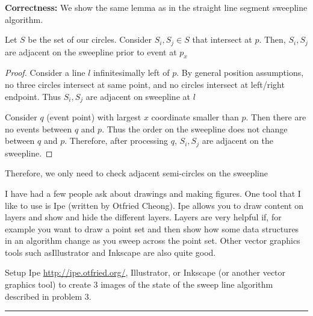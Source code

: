 \documentclass[11pt]{article}
\begin{document}
\textbf{Correctness: } We show the same lemma as in the straight line segment sweepline algorithm.

\begin{lemma}
    Let $S$ be the set of our circles. Consider $S_i, S_j \in S$ that intersect at $p$.
    Then, $S_i, S_j$ are adjacent on the sweepline prior to event at $p_x$
\end{lemma}

\begin{proof}
    Consider a line $l$ infinitesimally left of $p$. By general position assumptions, 
    no three circles intersect at same point, and no circles intersect at left/right endpoint.
    Thus $S_i, S_j$ are adjacent on sweepline at $l$

    Consider $q$ (event point) with largest $x$ coordinate smaller than $p$.
    Then there are no events between $q$ and $p$. Thus the order on the sweepline does not change between $q$ and $p$.
    Therefore, after processing $q$, $S_i, S_j$ are adjacent on the sweepline.
\end{proof}

Therefore, we only need to check adjacent semi-circles on the sweepline


I have had a few people ask about drawings and making figures.  One tool that I
like to use is Ipe (written by Otfried Cheong).  Ipe allows you to draw content
on layers and show and hide the different layers.  Layers are very helpful if,
for example you want to draw a point set and then show how some data structures
in an algorithm change as you sweep across the point set.
Other vector graphics tools such asIllustrator and Inkscape are also quite good.

Setup Ipe \url{http://ipe.otfried.org/}, Illustrator, or Inkscape
(or another vector graphics tool)
to create 3 images of the state of the sweep line algorithm
described in problem 3.

\hrule
\end{document}
